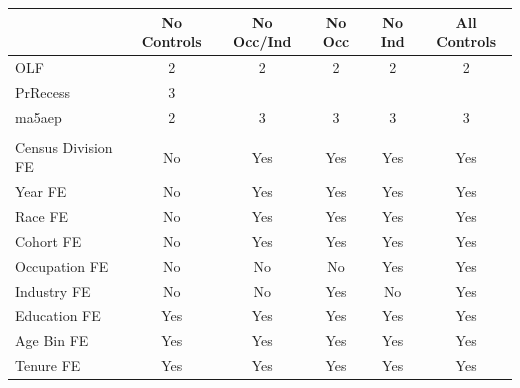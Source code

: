 \begin{tabular}{lccccc}
\hline\hline
  & No Controls & No Occ/Ind & No Occ & No Ind & All Controls \\
\hline
OLF&2&2&2&2&2\\
PrRecess&3&&&&\\
ma5aep&2&3&3&3&3\\
\hline
\multicolumn{6}{l}{} \\
Census Division FE & No & Yes & Yes & Yes & Yes \\
Year FE & No & Yes & Yes & Yes & Yes \\
Race FE & No & Yes & Yes & Yes & Yes \\
Cohort FE & No & Yes & Yes & Yes & Yes \\
Occupation FE & No & No & No & Yes & Yes \\
Industry FE & No & No & Yes & No & Yes \\
Education FE & Yes & Yes & Yes & Yes & Yes \\
Age Bin FE & Yes & Yes & Yes & Yes & Yes \\
Tenure FE & Yes & Yes & Yes & Yes & Yes \\
\hline\hline
\end{tabular}
